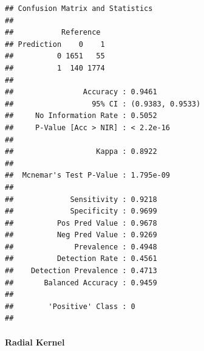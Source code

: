 \documentclass[
]{article}
\newenvironment{Shaded}{\begin{snugshade}}{\end{snugshade}}
\newcommand{\AttributeTok}[1]{\textcolor[rgb]{0.77,0.63,0.00}{#1}}
\newcommand{\DecValTok}[1]{\textcolor[rgb]{0.00,0.00,0.81}{#1}}
\newcommand{\FloatTok}[1]{\textcolor[rgb]{0.00,0.00,0.81}{#1}}
\newcommand{\FunctionTok}[1]{\textcolor[rgb]{0.00,0.00,0.00}{#1}}
\newcommand{\NormalTok}[1]{#1}
\newcommand{\OtherTok}[1]{\textcolor[rgb]{0.56,0.35,0.01}{#1}}
\newcommand{\SpecialCharTok}[1]{\textcolor[rgb]{0.00,0.00,0.00}{#1}}
\begin{document}
\begin{Shaded}
\end{Shaded}

\begin{verbatim}
## Confusion Matrix and Statistics
## 
##           Reference
## Prediction    0    1
##          0 1651   55
##          1  140 1774
##                                           
##                Accuracy : 0.9461          
##                  95% CI : (0.9383, 0.9533)
##     No Information Rate : 0.5052          
##     P-Value [Acc > NIR] : < 2.2e-16       
##                                           
##                   Kappa : 0.8922          
##                                           
##  Mcnemar's Test P-Value : 1.795e-09       
##                                           
##             Sensitivity : 0.9218          
##             Specificity : 0.9699          
##          Pos Pred Value : 0.9678          
##          Neg Pred Value : 0.9269          
##              Prevalence : 0.4948          
##          Detection Rate : 0.4561          
##    Detection Prevalence : 0.4713          
##       Balanced Accuracy : 0.9459          
##                                           
##        'Positive' Class : 0               
## 
\end{verbatim}

\hypertarget{radial-kernel}{%
\paragraph{Radial Kernel}\label{radial-kernel}}
\end{document}
